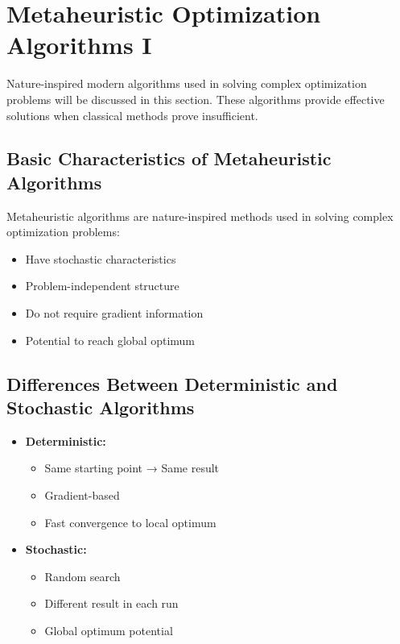 \section{Metaheuristic Optimization Algorithms I}
Nature-inspired modern algorithms used in solving complex optimization problems will be discussed in this section. These algorithms provide effective solutions when classical methods prove insufficient.

\subsection{Basic Characteristics of Metaheuristic Algorithms}

Metaheuristic algorithms are nature-inspired methods used in solving complex optimization problems:

\begin{itemize}
    \item Have stochastic characteristics
    \item Problem-independent structure
    \item Do not require gradient information
    \item Potential to reach global optimum
\end{itemize}


\subsection{Differences Between Deterministic and Stochastic Algorithms}

\begin{tcolorbox}[title=Deterministic vs Stochastic]
\begin{itemize}
    \item \textbf{Deterministic:}
        \begin{itemize}
            \item Same starting point → Same result
            \item Gradient-based
            \item Fast convergence to local optimum
        \end{itemize}
    \item \textbf{Stochastic:}
        \begin{itemize}
            \item Random search
            \item Different result in each run
            \item Global optimum potential
        \end{itemize}
\end{itemize}
\end{tcolorbox}

